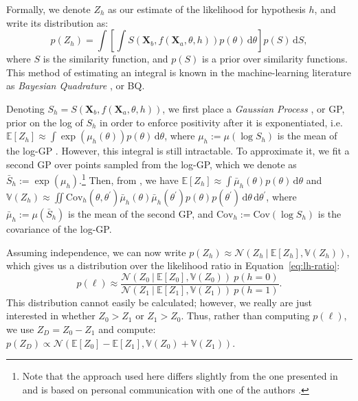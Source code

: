 \documentclass[10pt,letterpaper]{article}
\newcommand{\Xa}[0]{\mathbf{X}_a}
\newcommand{\Xb}[0]{\mathbf{X}_b}
\newcommand{\hi}[0]{h=0}
\newcommand{\hf}[0]{h=1}
\newcommand{\dif}[0]{\,\mathrm{d}}
\begin{document}
Formally, we denote $Z_h$ as our estimate of the likelihood for
hypothesis $h$, and write its distribution as:
\begin{equation}
  p(Z_h) = \int \left[\int S(\Xb, f(\Xa, \theta, h))p(\theta)\dif\theta\right] p(S)\dif S,
\end{equation}
where $S$ is the similarity function, and $p(S)$ is a prior over
similarity functions.  This method of estimating an integral is known
in the machine-learning literature as \textit{Bayesian Quadrature}
\cite{Diaconis:1988uo,Osborne:2012tm}, or BQ.

Denoting $S_h=S(\Xb, f(\Xa, \theta, h))$, we first place a
\textit{Gaussian Process} \cite{Rasmussen:2006vz}, or GP, prior on the
log of $S_h$ in order to enforce positivity after it is exponentiated,
i.e. $\mathbb{E}[Z_h] \approx \int
\exp(\mu_h(\theta))p(\theta)\dif\theta$, where $\mu_h:=\mu(\log S_h)$
is the mean of the log-GP \cite{Osborne:2012tm}.  However, this
integral is still intractable. To approximate it, we fit a second GP
over points sampled from the log-GP, which we denote as
$\bar{S}_h:=\exp(\mu_h)$.\footnote{Note that the approach used here
  differs slightly from the one presented in 
  and is based on personal communication with one of the authors
  \cite{Duvenaud:2013td}.} Then, from , we have
$\mathbb{E}[Z_h] \approx \int \bar{\mu}_h(\theta)p(\theta)\dif\theta$
and $\mathbb{V}(Z_h) \approx \iint \mathrm{Cov}_h(\theta,
\theta^\prime)\bar{\mu}_h(\theta)\bar{\mu}_h(\theta^\prime)p(\theta)p(\theta^\prime)\dif\theta\dif\theta^\prime$,
where $\bar{\mu}_h:=\mu(\bar{S}_h)$ is the mean of the second GP, and
$\mathrm{Cov}_h:=\mathrm{Cov}(\log S_h)$ is the covariance of the
log-GP.

Assuming independence, we can now write $p(Z_h)\approx\mathcal{N}(Z_h\
\vert\ \mathbb{E}[Z_h], \mathbb{V}(Z_h))$, which gives us a
distribution over the likelihood ratio in Equation~\ref{eq:lh-ratio}:
\begin{equation}
p(\ell)\approx\frac{\mathcal{N}(Z_0\ \vert\ \mathbb{E}[Z_0], \mathbb{V}(Z_0))\ p(\hi)}{\mathcal{N}(Z_1\ \vert\ \mathbb{E}[Z_1], \mathbb{V}(Z_1))\ p(\hf)}.
\end{equation}
This distribution cannot easily be calculated; however, we really are
just interested in whether $Z_0>Z_1$ or $Z_1>Z_0$. Thus, rather than
computing $p(\ell)$, we use $Z_D=Z_0-Z_1$ and compute:
$p(Z_D)\propto\mathcal{N}(\mathbb{E}[Z_0] - \mathbb{E}[Z_1],
\mathbb{V}(Z_0) + \mathbb{V}(Z_1))$.
\end{document}
